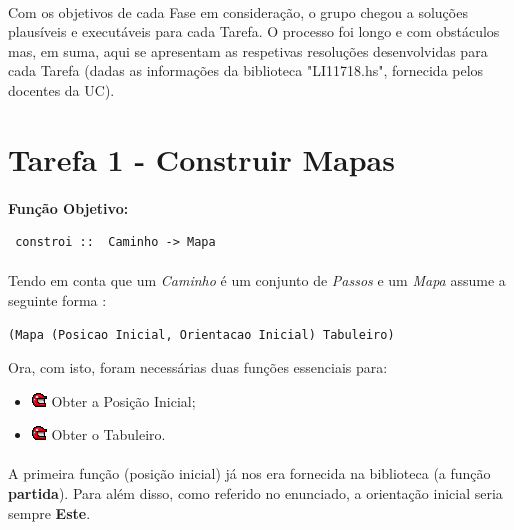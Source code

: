 \documentclass[12pt,a4paper]{report}
\begin{document}
 \paragraph{}Com os objetivos de cada Fase em consideração, o grupo chegou a soluções plausíveis e executáveis para cada Tarefa. O processo foi longo e com obstáculos mas, em suma, aqui se apresentam as respetivas resoluções desenvolvidas para cada Tarefa (dadas as informações da biblioteca "LI11718.hs", fornecida pelos docentes da UC).
 
 \section{Tarefa 1 - Construir Mapas}
 \label{Tarefa1_2017li1g77}
 
 \paragraph{}\textbf{Função Objetivo:}
 \begin{verbatim}
 constroi ::  Caminho -> Mapa
 \end{verbatim}
 
\paragraph{}Tendo em conta que um \textit{Caminho} é um conjunto de \textit{Passos}
e um \textit{Mapa} assume a seguinte forma : 
\begin{verbatim}
(Mapa (Posicao Inicial, Orientacao Inicial) Tabuleiro)
\end{verbatim}

Ora, com isto, foram necessárias duas funções essenciais para:
\begin{itemize}
\item[]\includegraphics[scale=0.7]{p4.png} Obter a Posição Inicial;
\item[]\includegraphics[scale=0.7]{p4.png} Obter o Tabuleiro.
\end{itemize}

\paragraph{}A primeira função (posição inicial) já nos era fornecida na biblioteca (a função \textbf{partida}). Para além disso, como referido no enunciado, a orientação inicial seria sempre \textbf{Este}.
\end{document}

